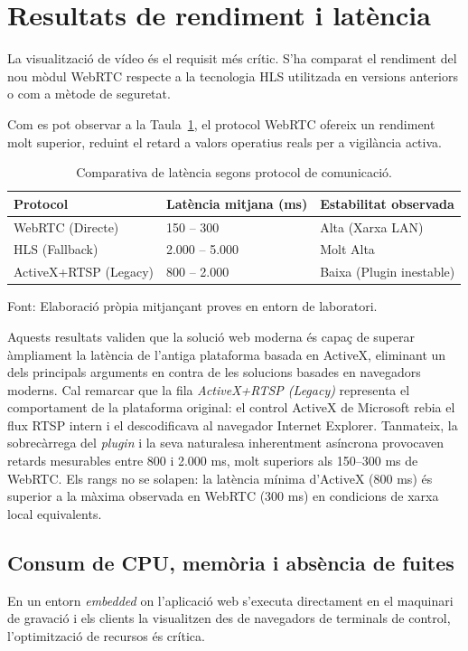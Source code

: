 \section{Resultats de rendiment i latència}
La visualització de vídeo és el requisit més crític. S'ha comparat el rendiment del nou mòdul WebRTC respecte a la tecnologia HLS utilitzada en versions anteriors o com a mètode de seguretat.

Com es pot observar a la Taula~\ref{tab:latencies}, el protocol WebRTC ofereix un rendiment molt superior, reduint el retard a valors operatius reals per a vigilància activa.

\begin{table}[htbp]
\centering
\caption{Comparativa de latència segons protocol de comunicació.}
\label{tab:latencies}
\begin{tabular}{@{}lll@{}}
\toprule
\textbf{Protocol} & \textbf{Latència mitjana (ms)} & \textbf{Estabilitat observada} \\ \midrule
WebRTC (Directe)      & 150 -- 300                     & Alta (Xarxa LAN)     \\
HLS (Fallback)        & 2.000 -- 5.000                 & Molt Alta            \\
ActiveX+RTSP (Legacy) & 800 -- 2.000                   & Baixa (Plugin inestable) \\ \bottomrule
\end{tabular}
\par\smallskip
\small Font: Elaboració pròpia mitjançant proves en entorn de laboratori.
\end{table}

Aquests resultats validen que la solució web moderna és capaç de superar àmpliament la latència de l'antiga plataforma basada en ActiveX, eliminant un dels principals arguments en contra de les solucions basades en navegadors moderns. Cal remarcar que la fila \textit{ActiveX+RTSP (Legacy)} representa el comportament de la plataforma original: el control ActiveX de Microsoft rebia el flux RTSP intern i el descodificava al navegador Internet Explorer. Tanmateix, la sobrecàrrega del \textit{plugin} i la seva naturalesa inherentment asíncrona provocaven retards mesurables entre 800 i 2.000 ms, molt superiors als 150--300 ms de WebRTC. Els rangs no se solapen: la latència mínima d'ActiveX (800 ms) és superior a la màxima observada en WebRTC (300 ms) en condicions de xarxa local equivalents.

\subsection{Consum de CPU, memòria i absència de fuites}
En un entorn \textit{embedded} on l'aplicació web s'executa directament en el maquinari de gravació i els clients la visualitzen des de navegadors de terminals de control, l'optimització de recursos és crítica. 

